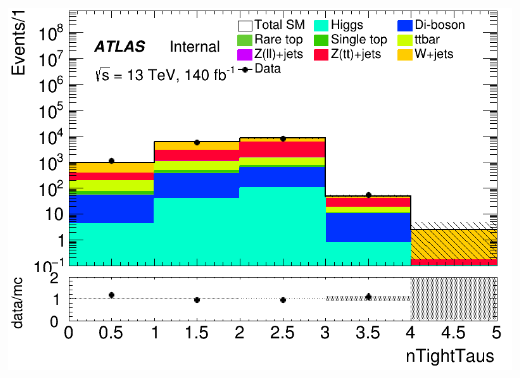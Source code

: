 \documentclass[usenames,dvipsnames]{beamer}
\begin{document}
\begin{frame}
\begin{minipage}{0.32\textwidth}
        \includegraphics[width=\textwidth]{graphics/HH_met/HH_met_nTightTaus.png}
    \end{minipage}
\end{frame}
\end{document}
